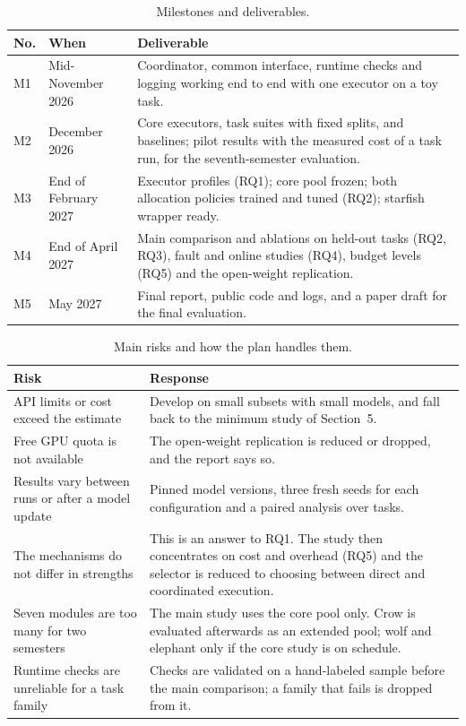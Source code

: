 \documentclass[11pt,a4paper]{article}
\newcommand{\head}[1]{\textbf{#1}}
\begin{document}
\begin{table}[H]
\centering\small
\caption{Milestones and deliverables.}
\label{tab:milestones}
\begin{tabularx}{\textwidth}{@{}P{0.9cm}P{3.1cm}L@{}}
\toprule
\head{No.} & \head{When} & \head{Deliverable} \\
\midrule
M1 & Mid-November 2026 & Coordinator, common interface, runtime checks and logging working end to end with
one executor on a toy task. \\
M2 & December 2026 & Core executors, task suites with fixed splits, and baselines; pilot results with the
measured cost of a task run, for the seventh-semester evaluation. \\
M3 & End of February 2027 & Executor profiles (RQ1); core pool frozen; both allocation policies trained and
tuned (RQ2); starfish wrapper ready. \\
M4 & End of April 2027 & Main comparison and ablations on held-out tasks (RQ2, RQ3), fault and online
studies (RQ4), budget levels (RQ5) and the open-weight replication. \\
M5 & May 2027 & Final report, public code and logs, and a paper draft for the final evaluation. \\
\bottomrule
\end{tabularx}
\end{table}

\begin{table}[H]
\centering\small
\caption{Main risks and how the plan handles them.}
\label{tab:risks}
\begin{tabularx}{\textwidth}{@{}P{5.2cm}L@{}}
\toprule
\head{Risk} & \head{Response} \\
\midrule
API limits or cost exceed the estimate & Develop on small subsets with small models, and fall back to the
minimum study of Section~5. \\
Free GPU quota is not available & The open-weight replication is reduced or dropped, and the report says
so. \\
Results vary between runs or after a model update & Pinned model versions, three fresh seeds for each
configuration and a paired analysis over tasks. \\
The mechanisms do not differ in strengths & This is an answer to RQ1. The study then concentrates on cost
and overhead (RQ5) and the selector is reduced to choosing between direct and coordinated execution. \\
Seven modules are too many for two semesters & The main study uses the core pool only. Crow is evaluated
afterwards as an extended pool; wolf and elephant only if the core study is on schedule. \\
Runtime checks are unreliable for a task family & Checks are validated on a hand-labeled sample before the
main comparison; a family that fails is dropped from it. \\
\bottomrule
\end{tabularx}
\end{table}
\end{document}
